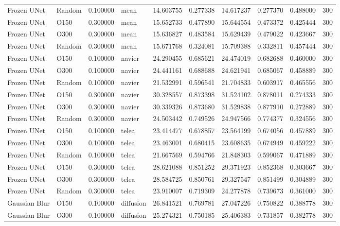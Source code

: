 \begin{table}[h]
\begin{tabular}{llrlrrrrrr}
Frozen UNet & Random & 0.100000 & mean & 14.603755 & 0.277338 & 14.617237 & 0.277370 & 0.488000 & 300 \\
Frozen UNet & O150 & 0.300000 & mean & 15.652733 & 0.477890 & 15.644554 & 0.473372 & 0.425444 & 300 \\
Frozen UNet & O300 & 0.300000 & mean & 15.636827 & 0.483584 & 15.629439 & 0.479022 & 0.423667 & 300 \\
Frozen UNet & Random & 0.300000 & mean & 15.671768 & 0.324081 & 15.709388 & 0.332811 & 0.457444 & 300 \\
Frozen UNet & O150 & 0.100000 & navier & 24.290455 & 0.685621 & 24.474019 & 0.682688 & 0.460000 & 300 \\
Frozen UNet & O300 & 0.100000 & navier & 24.441161 & 0.688688 & 24.621941 & 0.685067 & 0.458889 & 300 \\
Frozen UNet & Random & 0.100000 & navier & 21.532991 & 0.596541 & 21.704833 & 0.603917 & 0.465556 & 300 \\
Frozen UNet & O150 & 0.300000 & navier & 30.328557 & 0.873398 & 31.524102 & 0.878011 & 0.274333 & 300 \\
Frozen UNet & O300 & 0.300000 & navier & 30.339326 & 0.873680 & 31.529838 & 0.877910 & 0.272889 & 300 \\
Frozen UNet & Random & 0.300000 & navier & 24.503442 & 0.749526 & 24.947566 & 0.774377 & 0.324556 & 300 \\
Frozen UNet & O150 & 0.100000 & telea & 23.414477 & 0.678857 & 23.564199 & 0.674056 & 0.457889 & 300 \\
Frozen UNet & O300 & 0.100000 & telea & 23.463001 & 0.680415 & 23.608635 & 0.674949 & 0.459222 & 300 \\
Frozen UNet & Random & 0.100000 & telea & 21.667569 & 0.594766 & 21.848303 & 0.599067 & 0.471889 & 300 \\
Frozen UNet & O150 & 0.300000 & telea & 28.621088 & 0.851252 & 29.371923 & 0.852368 & 0.303667 & 300 \\
Frozen UNet & O300 & 0.300000 & telea & 28.584725 & 0.850761 & 29.327547 & 0.851499 & 0.304889 & 300 \\
Frozen UNet & Random & 0.300000 & telea & 23.910007 & 0.719309 & 24.277878 & 0.739673 & 0.361000 & 300 \\
Gaussian Blur & O150 & 0.100000 & diffusion & 26.841521 & 0.769781 & 27.047226 & 0.750822 & 0.388778 & 300 \\
Gaussian Blur & O300 & 0.100000 & diffusion & 25.274321 & 0.750185 & 25.406383 & 0.731857 & 0.382778 & 300 \\

\end{tabular}
\end{table}
